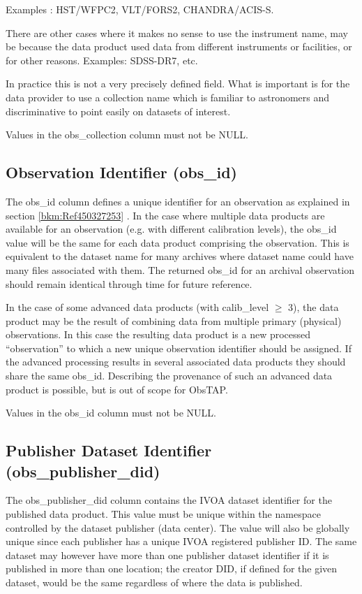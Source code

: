 \documentclass[11pt,a4paper]{ivoa}
\begin{document}
Examples : HST/WFPC2, VLT/FORS2, CHANDRA/ACIS-S.

There are other cases where it makes no sense to use the instrument name, may be because the data product used data from
different instruments or facilities, or for other reasons.  Examples: SDSS-DR7, etc.

In practice this is not a very precisely defined field.  What is important is for the data provider to use a collection
name which is familiar to astronomers and discriminative to point easily on datasets of interest.

Values in the obs\_collection column must not be NULL.

\subsection{Observation Identifier (obs\_id)}
The obs\_id column defines a unique identifier for an observation as explained in section \ref{bkm:Ref450327253} . In
the case where multiple data products are available for an observation (e.g. with different calibration levels), the
obs\_id value will be the same for each data product comprising the observation. This is equivalent to the dataset name
for many archives where dataset name could have many files associated with them. The returned obs\_id for an archival
observation should remain identical through time for future reference.

In the case of some advanced data products (with calib\_level ${\geq}$ 3), the data product may be the result of
combining data from multiple primary (physical) observations.  In this case the resulting data product is a new
processed ``observation'' to which a new unique observation identifier should be assigned.  If the advanced processing
results in several associated data products they should share the same obs\_id.  Describing the provenance of such an
advanced data product is possible, but is out of scope for ObsTAP.

Values in the obs\_id column must not be NULL.

\subsection{Publisher Dataset Identifier (obs\_publisher\_did)}
The obs\_publisher\_did column contains the IVOA dataset identifier \citep{2007ivoa.spec.0314P} for the published data
product.  This value must be unique within the namespace controlled by the dataset publisher (data center).  The value
will also be globally unique since each publisher has a unique IVOA registered publisher ID.  The same dataset may
however have more than one publisher dataset identifier if it is published in more than one location; the creator DID,
if defined for the given dataset, would be the same regardless of where the data is published.
\end{document}
